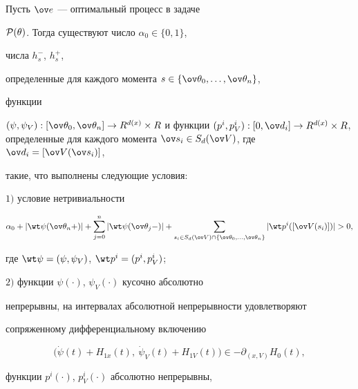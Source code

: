 \begin{thm}


Пусть $\ov e$ --- оптимальный процесс в задаче


${\cal P}(\theta)$. Тогда существуют число $\alpha_0\in \{0,1\}$,


числа $h_s^{-}$, $h_s^{+}$,


определенные для каждого момента $s\in


\{\ov\theta_0,\dotsc,\ov\theta_n\}$,


функции


$(\psi,\psi_V):[\ov\theta_0,\ov\theta_n]\rightarrow


R^{d(x)}\times R$ и функции $(p^i,p_V^i):[0,\ov d_i]\rightarrow


R^{d(x)}\times R$, определенные для каждого момента $\ov s_i\in


S_d(\ov V)$, где $\ov d_i=[\ov V(\ov s_i)]$,


такие, что выполнены следующие условия$:$





$1)$ условие нетривиальности


$$


\alpha_0+ |\wt \psi(\ov \theta_n+)|+\sum_{j=0}^n|\wt


\psi(\ov \theta_j-)|


+\sum_{s_i\in S_d(\ov V)\cap


\{\ov\theta_0,\dotsc,\ov\theta_{n}\}}|\wt


p^i([\ov V(s_i)])|>0,


$$


где $\wt\psi=(\psi,\psi_V)$, $\wt p^i=(p^i,p_V^i)$;





$2)$ функции $\psi(\cdot)$, $\psi_V(\cdot)$ кусочно абсолютно


непрерывны, на интервалах абсолютной непрерывности удовлетворяют


сопряженному дифференциальному включению


\begin{equation}


\big(\Dot{\psi}(t)+H_{1x}(t),\ \Dot{\psi}_V(t)+H_{1V}(t)\big) \in


-\partial_{(x,V)} {H}_0(t), \label{eq:(5.45)}


\end{equation}


функции $p^i(\cdot)$, $p_V^i(\cdot)$ абсолютно непрерывны,



\end{thm}
